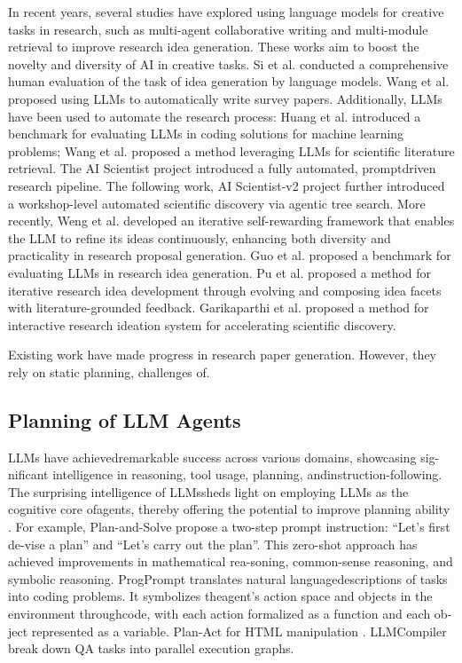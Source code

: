\documentclass[manuscript,review,anonymous]{acmart}
\begin{document}
In recent years, several studies have explored using language models for creative
tasks in research, such as multi-agent collaborative writing \cite{baek2025researchagent} and multi-module retrieval \cite{yang2024large} to improve research idea generation. These works aim to boost the novelty and diversity of AI in creative tasks. Si et al. \cite{si2024can} conducted a comprehensive human evaluation of the task of idea generation by language models. Wang et al. \cite{wang2024autosurvey} proposed using LLMs to automatically write survey papers. Additionally, LLMs have been used to automate the research process: Huang et al. \cite{huang2024mlagentbench} introduced a benchmark for evaluating LLMs in coding solutions for machine learning problems; Wang et al. \cite{wang2023scimon} proposed a method leveraging LLMs for scientific
literature retrieval. The AI Scientist project \cite{lu2024ai} introduced a fully automated, promptdriven research pipeline. The following work, AI Scientist-v2 project \cite{yamada2025ai} further introduced a workshop-level automated scientific discovery via agentic tree search. More recently, Weng et al. \cite{weng2025cycleresearcher} developed an iterative self-rewarding framework that enables the LLM to refine its ideas continuously, enhancing both diversity and practicality in research proposal generation. Guo et al. \cite{guo2025ideabench} proposed a benchmark for evaluating LLMs in research idea generation. Pu et al. \cite{pu2025ideasynth} proposed a method for iterative research idea development through evolving and composing idea facets with literature-grounded feedback. Garikaparthi et al. \cite{garikaparthi2025iris} proposed a method for interactive research ideation system for accelerating scientific discovery.

Existing work have made progress in research paper generation. However, they rely on static planning, challenges of.

\subsection{Planning of LLM Agents}
LLMs have achievedremarkable success across various domains, showcasing sig-nificant intelligence in reasoning, tool usage, planning, andinstruction-following. The surprising intelligence of LLMssheds light on employing LLMs as the cognitive core ofagents, thereby offering the potential to improve planning ability \cite{huang2024understanding}. For example, Plan-and-Solve \cite{wang2023plan} propose a two-step prompt instruction: “Let’s first de-vise a plan” and “Let’s carry out the plan”. This zero-shot approach has achieved improvements in mathematical rea-soning, common-sense reasoning, and symbolic reasoning. ProgPrompt \cite{singh2023progprompt} translates natural languagedescriptions of tasks into coding problems. It symbolizes theagent’s action space and objects in the environment throughcode, with each action formalized as a function and each ob-ject represented as a variable. Plan-Act \cite{erdogan2025planact} for HTML manipulation .  LLMCompiler \cite{kim2024llm} break down QA tasks into parallel execution graphs.
\end{document}
